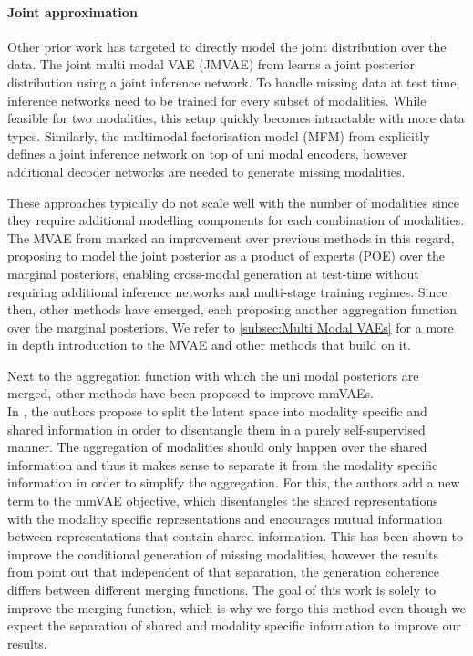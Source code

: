 \paragraph{Joint approximation}
Other prior work has targeted to directly model the joint distribution over the data.
The joint multi modal VAE (JMVAE) from \cite{suzuki2016joint} learns a joint posterior distribution using a joint inference network.
To handle missing data at test time, inference networks need to be trained for every subset of modalities.
While feasible for two modalities, this setup quickly becomes intractable with more data types.
Similarly, the multimodal factorisation model (MFM) from \cite{tsai2018learning} explicitly defines a joint inference network on top of uni modal encoders, however additional decoder networks are needed to generate missing modalities.

These approaches typically do not scale well with the number of modalities since they require additional modelling components for each combination of modalities.
The MVAE from \citep{poe} marked an improvement over previous methods in this regard, proposing to model the joint posterior as a product of experts (POE) over the marginal posteriors, enabling cross-modal generation at test-time without requiring additional inference networks and multi-stage training regimes.
Since then, other methods have emerged, each proposing another aggregation function over the marginal posteriors.
We refer to \cref{subsec:Multi Modal VAEs} for a more in depth introduction to the MVAE and other methods that build on it.

Next to the aggregation function with which the uni modal posteriors are merged, other methods have been proposed to improve mmVAEs.\\
In \citep{daun_disent}, the authors propose to split the latent space into modality specific and shared information in order to disentangle them in a purely self-supervised manner.
The aggregation of modalities should only happen over the shared information and thus it makes sense to separate it from the modality specific information in order to simplify the aggregation.
For this, the authors add a new term to the mmVAE objective, which disentangles the shared representations with the modality specific representations and encourages mutual information between representations that contain shared information.
This has been shown to improve the conditional generation of missing modalities, however the results from \citep{sutter_multimodal_2020} point out that independent of that separation, the generation coherence differs between different merging functions.
The goal of this work is solely to improve the merging function, which is why we forgo this method even though we expect the separation of shared and modality specific information to improve our results.
